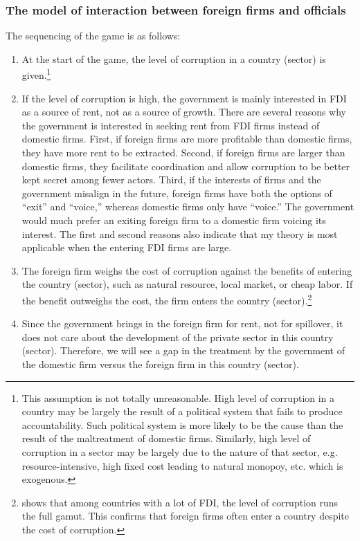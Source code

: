 \subsubsection{The model of interaction between foreign firms and officials}

The sequencing of the game is as follows:
\begin{enumerate}
\item At the start of the game, the level of corruption in a country (sector) is given.\footnote{This assumption is not totally unreasonable. High level of corruption in a country may be largely the result of a political system that fails to produce accountability. Such political system is more likely to be the cause than the result of the maltreatment of domestic firms. Similarly, high level of corruption in a sector may be largely due to the nature of that sector, e.g. resource-intensive, high fixed cost leading to natural monopoy, etc. which is exogenous.}
\item  If the level of corruption is high, the government is mainly interested in FDI as a source of rent, not as a source of growth. There are several reasons why the government is interested in seeking rent from FDI firms instead of domestic firms. First, if foreign firms are more profitable than domestic firms, they have more rent to be extracted. Second, if foreign firms are larger than domestic firms, they facilitate coordination and allow corruption to be better kept secret among fewer actors. Third, if the interests of firms and the government misalign in the future, foreign firms have both the options of ``exit'' and ``voice,'' whereas domestic firms only have ``voice.'' The government would much prefer an exiting foreign firm to a domestic firm voicing its interest. The first and second reasons also indicate that my theory is most applicable when the entering FDI firms are large.
\item The foreign firm weighs the cost of corruption against the benefits of entering the country (sector), such as natural resource, local market, or cheap labor. If the benefit outweighs the cost, the firm enters the country (sector).\footnote{ shows that among countries with a lot of FDI, the level of corruption runs the full gamut. This confirms that foreign firms often enter a country despite the cost of corruption.}
\item Since the government brings in the foreign firm for rent, not for spillover, it does not care about the development of the private sector in this country (sector). Therefore, we will see a gap in the treatment by the government of the domestic firm versus the foreign firm in this country (sector).
\end{enumerate}

